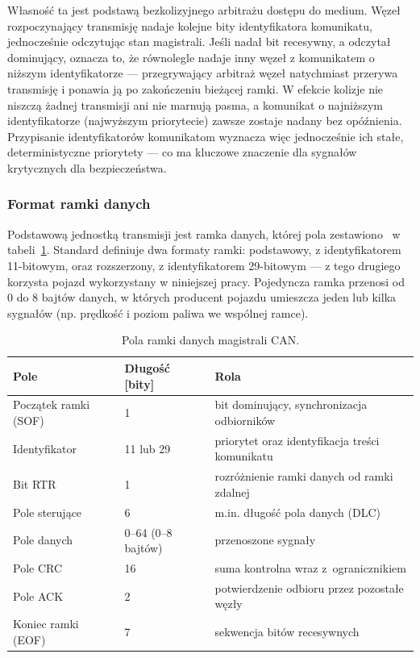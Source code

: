 Własność ta jest podstawą bezkolizyjnego arbitrażu dostępu do medium. Węzeł
rozpoczynający transmisję nadaje kolejne bity identyfikatora komunikatu,
jednocześnie odczytując stan magistrali. Jeśli nadał bit recesywny,
a odczytał dominujący, oznacza to, że równolegle nadaje inny węzeł
z komunikatem o niższym identyfikatorze --- przegrywający arbitraż węzeł
natychmiast przerywa transmisję i ponawia ją po zakończeniu bieżącej ramki.
W efekcie kolizje nie niszczą żadnej transmisji ani nie marnują pasma,
a komunikat o najniższym identyfikatorze (najwyższym priorytecie) zawsze
zostaje nadany bez opóźnienia. Przypisanie identyfikatorów komunikatom
wyznacza więc jednocześnie ich stałe, deterministyczne priorytety --- co ma
kluczowe znaczenie dla sygnałów krytycznych dla bezpieczeństwa.

\subsubsection{Format ramki danych}

Podstawową jednostką transmisji jest ramka danych, której pola
zestawiono~\cite{bosch1991} w tabeli~\ref{tab:ramka-can}. Standard definiuje dwa formaty ramki: podstawowy,
z identyfikatorem 11-bitowym, oraz rozszerzony, z identyfikatorem 29-bitowym
--- z tego drugiego korzysta pojazd wykorzystany w niniejszej pracy.
Pojedyncza ramka przenosi od 0 do 8 bajtów danych, w których producent
pojazdu umieszcza jeden lub kilka sygnałów (np. prędkość i poziom paliwa
we wspólnej ramce).

\begin{table}[!h]
    \centering
    \caption{Pola ramki danych magistrali CAN.}
    \label{tab:ramka-can}
    \begin{tabular}{| p{4.2cm} | p{3.1cm} | p{5.6cm} |} \hline
        \textbf{Pole} & \textbf{Długość [bity]} & \textbf{Rola} \\ \hline\hline
        Początek ramki (SOF) & 1 & bit dominujący, synchronizacja odbiorników \\ \hline
        Identyfikator & 11 lub 29 & priorytet oraz identyfikacja treści komunikatu \\ \hline
        Bit RTR & 1 & rozróżnienie ramki danych od ramki zdalnej \\ \hline
        Pole sterujące & 6 & m.in. długość pola danych (DLC) \\ \hline
        Pole danych & 0--64 (0--8 bajtów) & przenoszone sygnały \\ \hline
        Pole CRC & 16 & suma kontrolna wraz z~ogranicznikiem \\ \hline
        Pole ACK & 2 & potwierdzenie odbioru przez pozostałe węzły \\ \hline
        Koniec ramki (EOF) & 7 & sekwencja bitów recesywnych \\ \hline
    \end{tabular}
\end{table}

